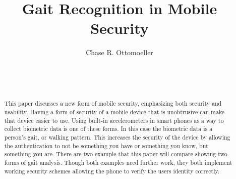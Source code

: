 \documentclass{sig-alternate}
\begin{document}

\title{Gait Recognition in Mobile Security}


\author{
\alignauthor
Chase R. Ottomoeller\\
	\\
	\\
	\\
}

\maketitle



\begin{abstract}
This paper discusses a new form of mobile security, emphasizing both security and usability. Having a form of security of a mobile device that is unobtrusive can make that device easier to use. Using built-in accelerometers in smart phones as a way to collect biometric data is one of these forms. In this case the biometric data is a person's gait, or walking pattern. This increases the security of the device by allowing the authentication to not be something you have or something you know, but something you are. There are two example that this paper will compare showing two forms of gait analysis. Though both examples need further work, they both implement working security schemes allowing the phone to  verify the users identity correctly.  
\end{abstract}




\end{document}
